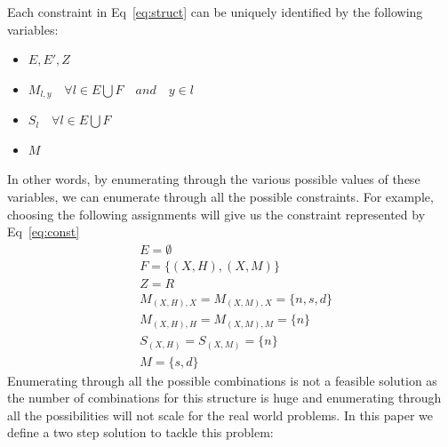 \documentclass{article}
\begin{document}
Each constraint in Eq~\ref{eq:struct} can be uniquely identified by the following variables:
\begin{itemize}
\item $E, E', Z$
\item $M_{l,y} \quad \forall l \in E \bigcup F \quad and\quad  y \in l$
\item $S_{l} \quad \forall l \in E \bigcup F$
\item $M$
\end{itemize}
In other words, by enumerating through the various possible values of these variables, we can enumerate through all the possible constraints. For example, choosing the following assignments will give us the constraint represented by Eq~\ref{eq:const}
\begin{align*}
&E=\emptyset\\
&F=\{(X,H),(X,M)\}\\
&Z=R\\
&M_{(X,H),X}=M_{(X,M),X}=\{n,s,d\}\\
&M_{(X,H),H}=M_{(X,M),M}=\{n\}\\
&S_{(X,H)}=S_{(X,M)}=\{n\}\\
&M=\{s,d\}
\end{align*}
Enumerating through all the possible combinations is not a feasible solution as the number of combinations for this structure is huge and enumerating through all the possibilities will not scale for the real world problems. In this paper we define a two step solution to tackle this problem:
\end{document}
